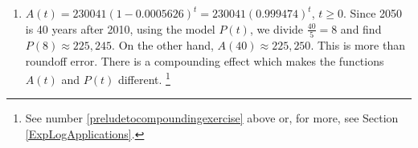 \begin{enumerate}
\begin{enumerate}
\item  $A(t) = 230041(1 - 0.0005626)^{t} =  230041 (0.999474)^{t}$, $t \geq 0$.  Since 2050 is 40 years after 2010, using the model $P(t)$, we divide $\frac{40}{5} = 8$ and find $P(8) \approx 225,245$. On the other hand, $A(40) \approx 225,250$.  This is more than roundoff error.  There is a compounding effect which makes the functions $A(t)$ and $P(t)$ different. \footnote{See number \ref{preludetocompoundingexercise} above or, for more, see Section \ref{ExpLogApplications}.}

\end{enumerate}


\setcounter{HW}{\value{enumi}}
\end{enumerate}


